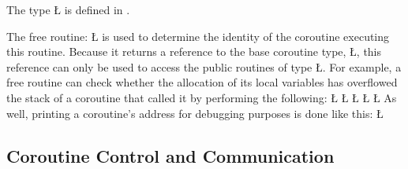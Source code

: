 \documentclass[openright,twoside]{report}
\begin{document}
The type \LGinlinetrue\LGbegin\lgrinde\L{}\endlgrinde\LGend{} is defined in .

The free routine:
\LGinlinefalse\LGbegin\lgrinde
\L{}
\endlgrinde\LGend
{}%
is used to determine the identity of the coroutine executing this routine.
Because it returns a reference to the base coroutine type, \LGinlinetrue\LGbegin\lgrinde\L{}\endlgrinde\LGend{}, this reference can only be used to access the public routines of type \LGinlinetrue\LGbegin\lgrinde\L{}\endlgrinde\LGend{}.
For example, a free routine can check whether the allocation of its local variables has overflowed the stack of a coroutine that called it by performing the following:
\LGinlinefalse\LGbegin\lgrinde
\L{}
\L{\LB{}}
\CE{}\L{\LB{}}
\CE{}\L{\LB{}}
\CE{}\L{\LB{\}}}
\endlgrinde\LGend
As well, printing a coroutine's address for debugging purposes is done like this:
\LGinlinefalse\LGbegin\lgrinde
\L{}
\CE{}\endlgrinde\LGend


\subsection{Coroutine Control and Communication}
\label{s:CoroutineControlCommunication}
\end{document}
